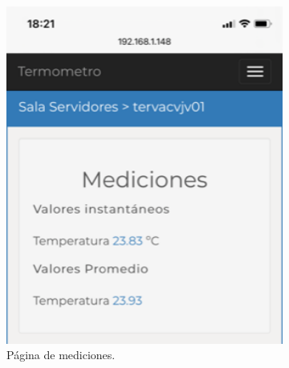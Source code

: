 \begin{figure}[!htpb]
\begin{subfigure}[b]{0.3\textwidth}
         \includegraphics[width=1\textwidth]{./Figures/medicionesWeb.png}
         \caption{Página de mediciones.}
         \label{fig:medicionesWeb}
     \end{subfigure}
     \hfill
     \begin{subfigure}[b]{0.3\textwidth}
         \centering

\end{subfigure}
\end{figure}
